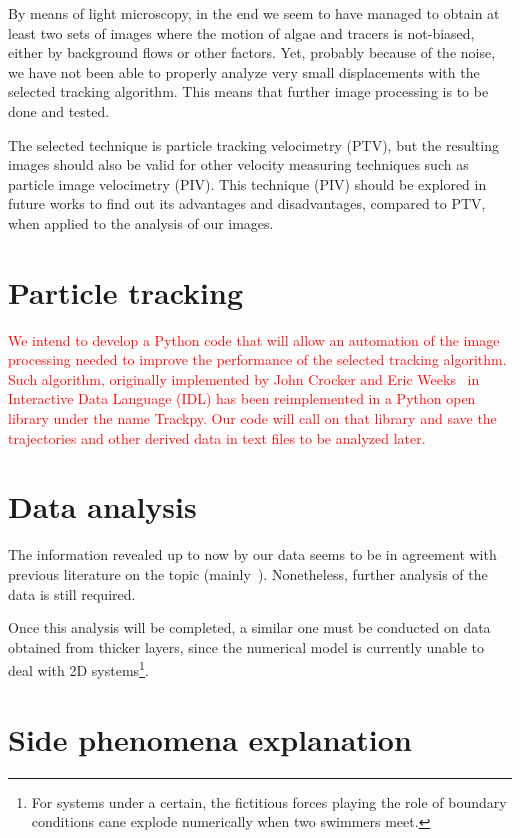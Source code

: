 By means of light microscopy, in the end we seem to have managed to obtain at least two sets of images where the motion of algae and tracers is not-biased, either by background flows or other factors. Yet, probably because of the noise, we have not been able to properly analyze very small displacements with the selected tracking algorithm. This means that further image processing is to be done and tested.

The selected technique is particle tracking velocimetry (PTV), but the resulting images should also be valid for other velocity measuring techniques such as particle image velocimetry (PIV). This technique (PIV) should be explored in future works to find out its advantages and disadvantages, compared to PTV, when applied to the analysis of our images.

\section{Particle tracking}


\textcolor{red}{We intend to develop a Python code that will allow an automation of the image processing needed to improve the performance of the selected tracking algorithm. Such algorithm, originally implemented by John Crocker and Eric Weeks~\cite{Crocker} in Interactive Data Language (IDL) has been reimplemented in a Python
open library under the name Trackpy. Our code will call on that library and save the trajectories and other derived data in text files to be analyzed later.}

\section{Data analysis}

The information revealed up to now by our data seems to be in agreement with previous literature on the topic (mainly~\cite{Kurtuldu2011}). Nonetheless, further analysis of the data is still required. 

Once this analysis will be completed, a similar one must be conducted on data obtained from thicker layers, since the numerical model is currently unable to deal with 2D systems\footnote{For systems under a certain, the fictitious forces playing the role of boundary conditions cane explode numerically when two swimmers meet.}.

\section{Side phenomena explanation}

